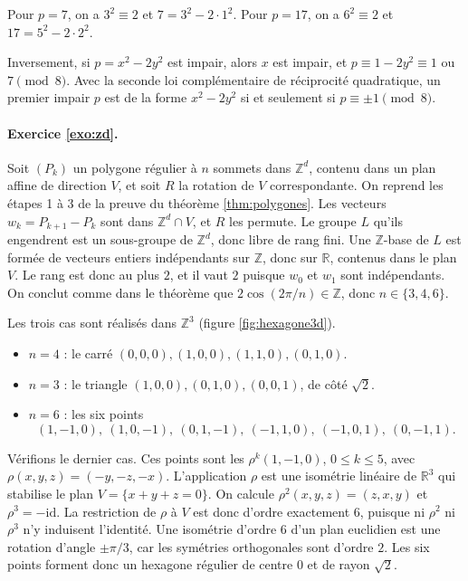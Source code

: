 \documentclass[11pt,a4paper]{article}
\theoremstyle{plain}
\theoremstyle{definition}
\theoremstyle{remark}
\newcommand{\Z}{\mathbb{Z}}
\newcommand{\R}{\mathbb{R}}
\begin{document}
Pour $p=7$, on a $3^2\equiv2$ et $7=3^2-2\cdot1^2$. Pour $p=17$, on a $6^2\equiv2$ et $17=5^2-2\cdot2^2$.

Inversement, si $p=x^2-2y^2$ est impair, alors $x$ est impair, et $p\equiv1-2y^2\equiv1$ ou $7\pmod 8$. Avec la seconde loi complémentaire de réciprocité quadratique, un premier impair $p$ est de la forme $x^2-2y^2$ si et seulement si $p\equiv\pm1\pmod8$.

\paragraph{Exercice \ref{exo:zd}.} Soit $(P_k)$ un polygone régulier à $n$ sommets dans $\Z^d$, contenu dans un plan affine de direction $V$, et soit $R$ la rotation de $V$ correspondante. On reprend les étapes 1 à 3 de la preuve du théorème \ref{thm:polygones}. Les vecteurs $w_k=P_{k+1}-P_k$ sont dans $\Z^d\cap V$, et $R$ les permute. Le groupe $L$ qu'ils engendrent est un sous-groupe de $\Z^d$, donc libre de rang fini. Une $\Z$-base de $L$ est formée de vecteurs entiers indépendants sur $\Z$, donc sur $\R$, contenus dans le plan $V$. Le rang est donc au plus $2$, et il vaut $2$ puisque $w_0$ et $w_1$ sont indépendants. On conclut comme dans le théorème que $2\cos(2\pi/n)\in\Z$, donc $n\in\{3,4,6\}$.

Les trois cas sont réalisés dans $\Z^3$ (figure \ref{fig:hexagone3d}).
\begin{itemize}[nosep]
\item $n=4$ : le carré $(0,0,0),(1,0,0),(1,1,0),(0,1,0)$.
\item $n=3$ : le triangle $(1,0,0),(0,1,0),(0,0,1)$, de côté $\sqrt2$.
\item $n=6$ : les six points
\[
  (1,-1,0),\ (1,0,-1),\ (0,1,-1),\ (-1,1,0),\ (-1,0,1),\ (0,-1,1).
\]
\end{itemize}
Vérifions le dernier cas. Ces points sont les $\rho^k(1,-1,0)$, $0\leq k\leq5$, avec $\rho(x,y,z)=(-y,-z,-x)$. L'application $\rho$ est une isométrie linéaire de $\R^3$ qui stabilise le plan $V=\{x+y+z=0\}$. On calcule $\rho^2(x,y,z)=(z,x,y)$ et $\rho^3=-\mathrm{id}$. La restriction de $\rho$ à $V$ est donc d'ordre exactement $6$, puisque ni $\rho^2$ ni $\rho^3$ n'y induisent l'identité. Une isométrie d'ordre $6$ d'un plan euclidien est une rotation d'angle $\pm\pi/3$, car les symétries orthogonales sont d'ordre $2$. Les six points forment donc un hexagone régulier de centre $0$ et de rayon $\sqrt2$.
\end{document}
